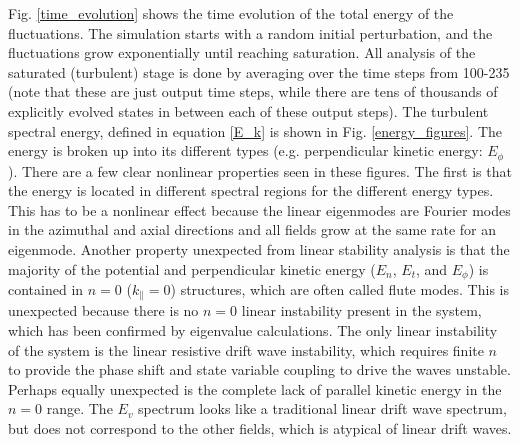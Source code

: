 \documentclass[showpacs,preprintnumbers,amsmath,amssymb,superscriptaddress]{revtex4}
\def\para{\parallel}
\begin{document}
Fig. \ref{time_evolution} shows the time evolution of the total energy of the fluctuations. The simulation starts with a random initial perturbation, and the fluctuations grow
exponentially until reaching saturation. All analysis of the saturated (turbulent) stage is done by averaging over the time steps from 100-235 (note that these are just output time steps, while
there are tens of thousands of explicitly evolved states in between each of these output steps).
The turbulent spectral energy, defined in equation \ref{E_k} is shown in Fig. \ref{energy_figures}. The energy is broken up into its different types (e.g. perpendicular kinetic energy: $E_\phi$).
There are a few clear nonlinear properties
seen in these figures. The first is that the energy is located in different spectral regions for the different energy types. This has to be a nonlinear effect because the linear eigenmodes
are Fourier modes in the azimuthal and axial directions and all fields grow at the same rate for an eigenmode. 
Another property unexpected from linear stability analysis is that the majority of the potential and perpendicular kinetic energy ($E_n$, $E_t$, and $E_\phi$) is contained in $n=0$ ($k_\para = 0$) 
structures, which are often called flute modes.
This is unexpected because there is no $n=0$ linear instability present in the system, which has been confirmed by eigenvalue calculations. The only linear instability of the system is the
linear resistive drift wave instability, which requires finite $n$ to provide the phase shift and state variable coupling to drive the waves unstable. Perhaps equally unexpected is the complete
lack of parallel kinetic energy in the $n=0$ range. The $E_v$ spectrum looks like a traditional linear drift wave spectrum, but does not correspond to the other fields, which is atypical of
linear drift waves.

\end{document}
